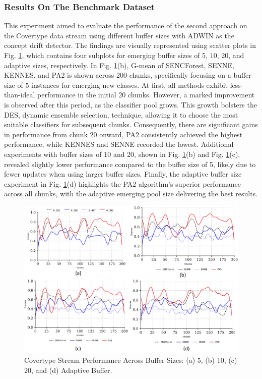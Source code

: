 \subsubsection{Results On The Benchmark Dataset}
\label{sec:covertype}
This experiment aimed to evaluate the performance of the second approach on the Covertype data stream using different buffer sizes with ADWIN as the concept drift detector. The findings are visually represented using scatter plots in Fig. \ref{fig:res1}, which contains four subplots for emerging buffer sizes of 5, 10, 20, and adaptive sizes, respectively. In Fig. \ref{fig:res1}(b), G-mean of SENCForest, SENNE, KENNES, and PA2 is shown across 200 chunks, specifically focusing on a buffer size of 5 instances for emerging new classes. At first, all methods exhibit less-than-ideal performance in the initial 20 chunks. However, a marked improvement is observed after this period, as the classifier pool grows. This growth bolsters the DES, dynamic ensemble selection, technique, allowing it to choose the most suitable classifiers for subsequent chunks. Consequently, there are significant gains in performance from chunk 20 onward, PA2 consistently achieved the highest performance, while KENNES and SENNE recorded the lowest. Additional experiments with buffer sizes of 10 and 20, shown in Fig. \ref{fig:res1}(b) and Fig. \ref{fig:res1}(c), revealed slightly lower performance compared to the buffer size of 5, likely due to fewer updates when using larger buffer sizes. Finally, the adaptive buffer size experiment in Fig. \ref{fig:res1}(d) highlights the PA2 algorithm's superior performance across all chunks, with the adaptive emerging pool size delivering the best results.

\begin{figure}[!ht]
	\centering
	\includegraphics[width=1\linewidth]{5_Emerging/images/res1.png}
	\caption{Covertype Stream Performance Across Buffer Sizes: (a) 5, (b) 10, (c) 20, and (d) Adaptive Buffer.}

	\label{fig:res1}
\end{figure}				

